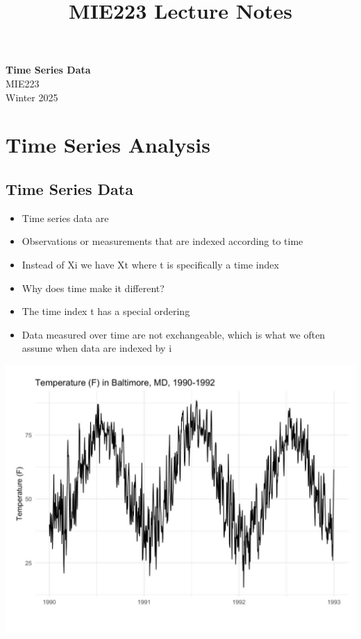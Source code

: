 \documentclass[11pt]{article}
\theoremstyle{definition}
\begin{document}
\setcounter{section}{0}
\title{MIE223 Lecture Notes}

\thispagestyle{empty}

\begin{center}
{\LARGE \bf Time Series Data}\\
{\large MIE223}\\
Winter 2025
\end{center}
\section{Time Series Analysis}
\subsection{Time Series Data}
\begin{itemize}
  \item Time series data are
  \item Observations or measurements that
  are indexed according to time
  \item Instead of Xi we have Xt where t is
  specifically a time index
  \item Why does time make it different?
  \item The time index t has a special ordering
  \item Data measured over time are not
  exchangeable, which is what we often
  assume when data are indexed by i
\end{itemize}
\includegraphics[width=\textwidth]{1.png}
\end{document}
